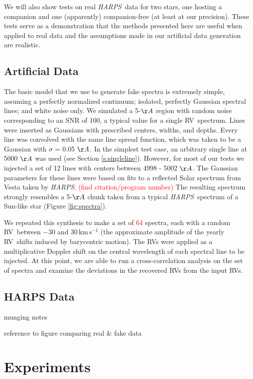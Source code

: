 \documentclass[modern]{aastex61}
\newcommand{\unit}[1]{\mathrm{#1}}
\newcommand{\km}{\unit{km}}
\newcommand{\s}{\unit{s}}
\newcommand{\kms}{\km\,\s^{-1}}
\newcommand{\todo}[1]{\textcolor{red}{#1}}  %
\newcommand{\acronym}[1]{{\small{#1}}}
\newcommand{\project}[1]{\textsl{#1}}
\newcommand{\HARPS}{\project{\acronym{HARPS}}}
\newcommand{\RV}{\acronym{RV}}
\begin{document}
We will also show tests on real \HARPS\ data for two stars, one hosting a companion and
one (apparently) companion-free (at least at our precision). 
These tests serve as a demonstration that the methods presented here are useful when applied to real data and the assumptions made in our artificial data generation are realistic.

\subsection{Artificial Data}

The basic model that we use to generate fake spectra is extremely simple, assuming a perfectly normalized continuum; isolated, perfectly Gaussian spectral lines; and white noise only. 
We simulated a 5-$\AA$ region with random noise corresponding to an SNR of 100, a typical value for a single \RV\ spectrum. 
Lines were inserted as Gaussians with prescribed centers, widths, and depths. 
Every line was convolved with the same line spread function, which was taken to be a Gaussian with $\sigma$ = 0.05 $\AA$. 
In the simplest test case, an arbitrary single line at 5000 $\AA$ was used (see Section \ref{s:singleline}). 
However, for most of our tests we injected a set of 12 lines with centers between 4998 - 5002 $\AA$. 
The Gaussian parameters for these lines were based on fits to a reflected Solar spectrum from Vesta taken by \HARPS. \todo{(find citation/program number)} 
The resulting spectrum strongly resembles a 5-$\AA$ chunk taken from a typical \HARPS\ spectrum of a Sun-like star (Figure \ref{fig:spectra}).

We repeated this synthesis to make a set of \todo{64} spectra, each with a random \RV\ between $-30$ and $30\,\kms$ (the approximate amplitude of the yearly \RV\ shifts induced by barycentric motion). 
The \RV s were applied as a multiplicative Doppler shift on the central wavelength of each spectral line to be injected. 
At this point, we are able to run a cross-correlation analysis on the set of spectra and examine the deviations in the recovered \RV s from the input \RV s.

\subsection{HARPS Data}

munging notes

reference to figure comparing real \& fake data

\section{Experiments}
\label{s:experiments}
\end{document}
